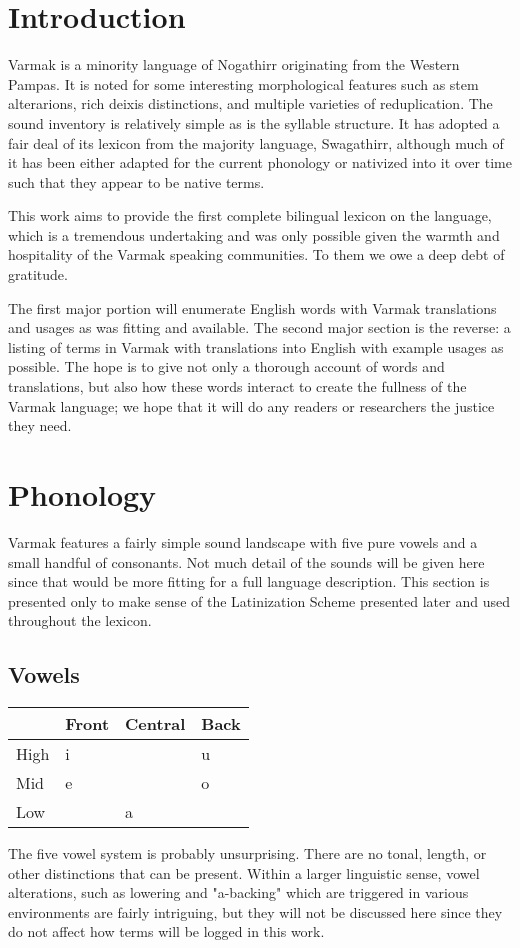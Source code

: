 \section*{Introduction}
  Varmak is a minority language of Nogathirr originating from the Western Pampas. It is noted for some interesting morphological features such as stem alterarions, rich deixis distinctions, and multiple varieties of reduplication. The sound inventory is relatively simple as is the syllable structure. It has adopted a fair deal of its lexicon from the majority language, Swagathirr, although much of it has been either adapted for the current phonology or nativized into it over time such that they appear to be native terms.\par
  This work aims to provide the first complete bilingual lexicon on the language, which is a tremendous undertaking and was only possible given the warmth and hospitality of the Varmak speaking communities. To them we owe a deep debt of gratitude.\par
  The first major portion will enumerate English words with Varmak translations and usages as was fitting and available. The second major section is the reverse: a listing of terms in Varmak with translations into English with example usages as possible. The hope is to give not only a thorough account of words and translations, but also how these words interact to create the fullness of the Varmak language; we hope that it will do any readers or researchers the justice they need.\par
\vertspace

\section*{Phonology}
  Varmak features a fairly simple sound landscape with five pure vowels and a small handful of consonants. Not much detail of the sounds will be given here since that would be more fitting for a full language description. This section is presented only to make sense of the Latinization Scheme presented later and used throughout the lexicon.
\vertspace

  \subsection*{Vowels}
  \begin{tabular}{|l|l|l|l|}
    \hline
            & Front & Central & Back \\ \hline \hline
    High    & i     &         & u    \\
    Mid     & e     &         & o    \\
    Low     &       & a       &      \\ \hline
  \end{tabular}
  \vertspace
    The five vowel system is probably unsurprising. There are no tonal, length, or other distinctions that can be present. Within a larger linguistic sense, vowel alterations, such as lowering and "a-backing" which are triggered in various environments are fairly intriguing, but they will not be discussed here since they do not affect how terms will be logged in this work.
  \verstpace

